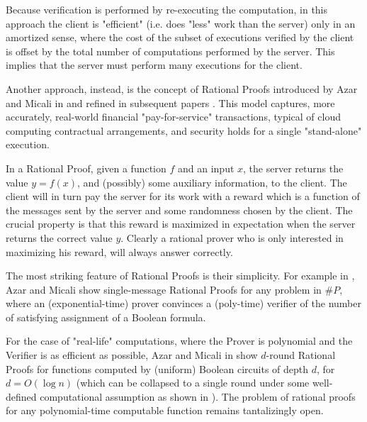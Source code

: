 Because verification is performed by re-executing the computation, in this approach the client is "efficient" (i.e. does "less" work than the server) only in an 
amortized sense, where the cost of the subset of executions verified by the client is offset by the total number of computations performed by the server. This implies that the server must perform many executions for the client. 

Another approach, instead, is the concept of {\sf Rational Proofs} introduced by Azar and Micali in \cite{am} and refined in subsequent papers \cite{am1,rosen}. This model captures, more accurately, real-world financial "pay-for-service" transactions, typical of cloud computing contractual arrangements, and security
holds for a single "stand-alone" execution.

In a Rational Proof, given a function $f$ and an input $x$, the server returns the value $y=f(x)$, and (possibly) some auxiliary information, to the client. The client will in turn 
pay the server for its work with a reward which is a function of the messages 
sent by the server and some randomness chosen by the client.  The crucial 
property is that this reward is maximized in expectation when the server 
returns the correct value $y$. Clearly a rational prover who is only interested 
in maximizing his reward, will always answer correctly. 

The most striking feature of Rational Proofs is their simplicity. For example in \cite{am}, Azar and Micali show {\sf single-message} Rational Proofs for any problem in $\#P$, where an (exponential-time) prover convinces a (poly-time) verifier of the number of satisfying assignment of a Boolean formula. 

For the case of "real-life" computations, where the Prover is polynomial and the Verifier is as efficient as possible, Azar and Micali in \cite{am1} show $d$-round Rational Proofs for functions computed by (uniform) Boolean circuits of depth $d$, for $d=O(\log n)$ (which can be collapsed to a single round under some well-defined computational assumption as shown in \cite{rosen}). The problem of rational proofs for any polynomial-time computable function remains tantalizingly open. 

